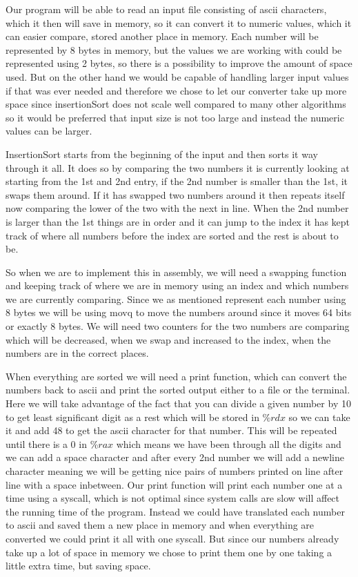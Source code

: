 \documentclass{article}
\begin{document}
Our program will be able to read an input file consisting of ascii characters, which it then will save in memory, so it can convert it to numeric values, which it can easier compare, stored another place in memory. Each number will be represented by 8 bytes in memory, but the values we are working with could be represented using 2 bytes, so there is a possibility to improve the amount of space used. But on the other hand we would be capable of handling larger input values if that was ever needed and therefore we chose to let our converter take up more space since insertionSort does not scale well compared to many other algorithms so it would be preferred that input size is not too large and instead the numeric values can be larger.

InsertionSort starts from the beginning of the input and then sorts it way through it all. It does so by comparing the two numbers it is currently looking at starting from the 1st and 2nd entry, if the 2nd number is smaller than the 1st, it swaps them around. If it has swapped two numbers around it then repeats itself now comparing the lower of the two with the next in line. When the 2nd number is larger than the 1st things are in order and it can jump to the index it has kept track of where all numbers before the index are sorted and the rest is about to be.

So when we are to implement this in assembly, we will need a swapping function and keeping track of where we are in memory using an index and which numbers we are currently comparing. Since we as mentioned represent each number using 8 bytes we will be using movq to move the numbers around since it moves 64 bits or exactly 8 bytes. We will need two counters for the two numbers are comparing which will be decreased, when we swap and increased to the index, when the numbers are in the correct places.

When everything are sorted we will need a print function, which can convert the numbers back to ascii and print the sorted output either to a file or the terminal. Here we will take advantage of the fact that you can divide a given number by 10 to get least significant digit as a rest which will be stored in $\%rdx$ so we can take it and add 48 to get the ascii character for that number. This will be repeated until there is a 0 in $\%rax$ which means we have been through all the digits and we can add a space character and after every 2nd number we will add a newline character meaning we will be getting nice pairs of numbers printed on line after line with a space inbetween. Our print function will print each number one at a time using a syscall, which is not optimal since system calls are slow will affect the running time of the program. Instead we could have translated each number to ascii and saved them a new place in memory and when everything are converted we could print it all with one syscall. But since our numbers already take up a lot of space in memory we chose to print them one by one taking a little extra time, but saving space.
\end{document}
